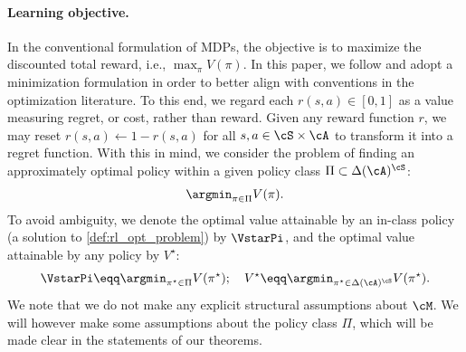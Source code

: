 \paragraph{Learning objective.}
In the conventional formulation of MDPs, the objective is to maximize the discounted total reward, i.e., $\max_\pi V(\pi)$. In this paper, we follow \citet{xiao2022convergence} and adopt a minimization formulation in order to better align with
conventions in the optimization literature. To this end, we regard each $r(s, a) \in [0, 1]$ as a value measuring regret, or cost, rather than reward. Given any reward function $r$, we may reset $r(s, a) \gets 1 - r(s, a)$ for all $s,a\in \cS \times \cA$ to transform it into a regret function.
With this in mind, we consider the problem of finding an approximately optimal policy within a given policy class $\Pi\subset \Delta(\cA)^\cS$:
\begin{align}\label{def:rl_opt_problem}
    \argmin_{\pi \in \Pi} V(\pi).
\end{align}
To avoid ambiguity, we denote the optimal value attainable by an in-class policy (a solution to \cref{def:rl_opt_problem}) by $\VstarPi$, and the optimal value attainable by any policy by $V^\star$:
\begin{align}
    \VstarPi \eqq \argmin_{\pi^\star \in \Pi}V(\pi^\star);
    \quad
    V^\star \eqq \argmin_{\pi^\star \in \Delta(\cA)^\cS}V(\pi^\star).
\end{align}
We note that we do not make any explicit structural assumptions about $\cM$. We will however make some assumptions about the policy class $\Pi$, which will be made clear in the statements of our theorems.

